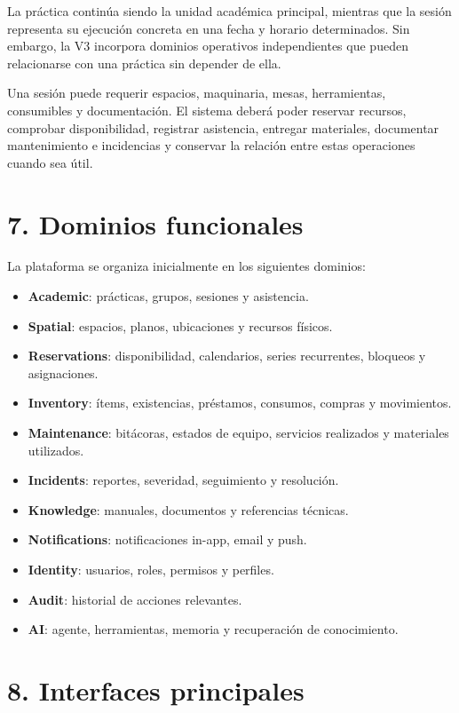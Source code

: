 \documentclass[12pt]{article}
\begin{document}
La práctica continúa siendo la unidad académica principal, mientras que la sesión representa su ejecución concreta en una fecha y horario determinados. Sin embargo, la V3 incorpora dominios operativos independientes que pueden relacionarse con una práctica sin depender de ella.

Una sesión puede requerir espacios, maquinaria, mesas, herramientas, consumibles y documentación. El sistema deberá poder reservar recursos, comprobar disponibilidad, registrar asistencia, entregar materiales, documentar mantenimiento e incidencias y conservar la relación entre estas operaciones cuando sea útil.

\section*{7. Dominios funcionales}

La plataforma se organiza inicialmente en los siguientes dominios:

\begin{itemize}[leftmargin=1.2cm]
    \item \textbf{Academic}: prácticas, grupos, sesiones y asistencia.
    \item \textbf{Spatial}: espacios, planos, ubicaciones y recursos físicos.
    \item \textbf{Reservations}: disponibilidad, calendarios, series recurrentes, bloqueos y asignaciones.
    \item \textbf{Inventory}: ítems, existencias, préstamos, consumos, compras y movimientos.
    \item \textbf{Maintenance}: bitácoras, estados de equipo, servicios realizados y materiales utilizados.
    \item \textbf{Incidents}: reportes, severidad, seguimiento y resolución.
    \item \textbf{Knowledge}: manuales, documentos y referencias técnicas.
    \item \textbf{Notifications}: notificaciones in-app, email y push.
    \item \textbf{Identity}: usuarios, roles, permisos y perfiles.
    \item \textbf{Audit}: historial de acciones relevantes.
    \item \textbf{AI}: agente, herramientas, memoria y recuperación de conocimiento.
\end{itemize}

\section*{8. Interfaces principales}
\end{document}

